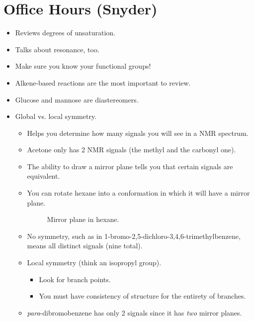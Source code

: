 \documentclass[../notes.tex]{subfiles}
\begin{document}
\section{Office Hours (Snyder)}
\begin{itemize}
    \item Reviews degrees of unsaturation.
    \item Talks about resonance, too.
    \item Make sure you know your functional groups!
    \item Alkene-based reactions are the most important to review.
    \item Glucose and mannose are diastereomers.
    \item Global vs. local symmetry.
    \begin{itemize}
        \item Helps you determine how many signals you will see in a  NMR spectrum.
        \item Acetone only has 2  NMR signals (the methyl and the carbonyl one).
        \item The ability to draw a mirror plane tells you that certain signals are equivalent.
        \item You can rotate hexane into a conformation in which it will have a mirror plane.
        \begin{figure}[h!]
            \centering
            \caption{Mirror plane in hexane.}
            \label{fig:hexaneMirrorPlane}
        \end{figure}
        \item No symmetry, such as in 1-bromo-2,5-dichloro-3,4,6-trimethylbenzene, means all distinct signals (nine total).
        \item Local symmetry (think an isopropyl group).
        \begin{itemize}
            \item Look for branch points.
            \item You must have consistency of structure for the entirety of branches.
        \end{itemize}
        \item \emph{para}-dibromobenzene has only 2 signals since it has \emph{two} mirror planes.
    \end{itemize}
\end{itemize}
\end{document}
